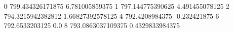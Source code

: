 0 799.434326171875 6.781005859375
1 797.144775390625 4.491455078125
2 794.3215942382812 1.66827392578125
4 792.4208984375 -0.232421875
6 792.6533203125 0.0
8 793.0863037109375 0.4329833984375
